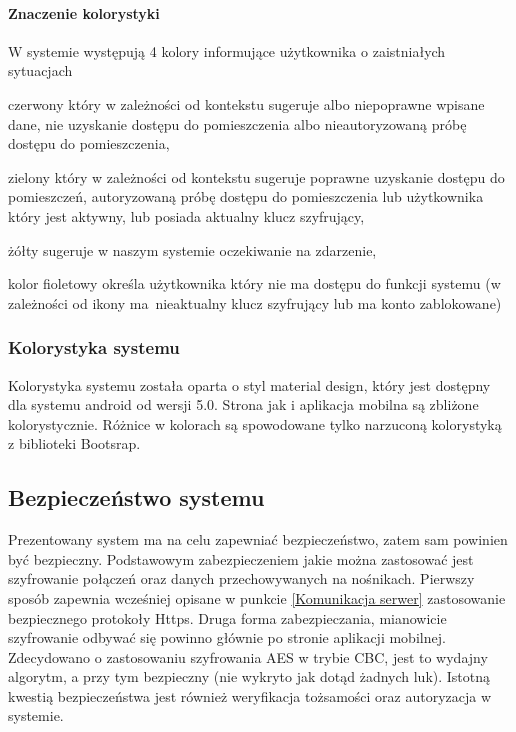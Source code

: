 \paragraph*{Znaczenie kolorystyki}
W systemie występują 4 kolory informujące użytkownika o zaistniałych sytuacjach
\begin{itemize*}
	\item czerwony który w zależności od kontekstu sugeruje albo niepoprawne wpisane dane, nie uzyskanie dostępu do pomieszczenia albo nieautoryzowaną próbę dostępu do pomieszczenia,
	\item zielony który w zależności od kontekstu sugeruje poprawne uzyskanie dostępu do pomieszczeń, autoryzowaną próbę dostępu do pomieszczenia lub użytkownika który jest aktywny, lub posiada aktualny klucz szyfrujący,
	\item żółty sugeruje w naszym systemie oczekiwanie na zdarzenie,
	\item kolor fioletowy określa użytkownika który nie ma dostępu do funkcji systemu (w zależności od ikony ma~nieaktualny klucz szyfrujący lub ma konto zablokowane)
\end{itemize*}

\subsubsection{Kolorystyka systemu}
Kolorystyka systemu została oparta o styl material design, który jest dostępny dla systemu android od wersji 5.0. Strona jak i aplikacja mobilna są zbliżone kolorystycznie. Różnice w kolorach są spowodowane tylko narzuconą kolorystyką z biblioteki Bootsrap\cite{And,desingMobile}.

\subsection{Bezpieczeństwo systemu}\label{sec:Projekt bezpieczeństwo}
Prezentowany system ma na celu zapewniać bezpieczeństwo, zatem sam powinien być bezpieczny. Podstawowym zabezpieczeniem jakie można zastosować jest szyfrowanie połączeń oraz danych przechowywanych na nośnikach. Pierwszy sposób zapewnia wcześniej opisane w punkcie \ref{Komunikacja serwer} zastosowanie bezpiecznego protokoły Https. Druga forma zabezpieczania, mianowicie szyfrowanie odbywać się powinno głównie po stronie aplikacji mobilnej. Zdecydowano o zastosowaniu szyfrowania AES w trybie CBC, jest to wydajny algorytm, a przy tym bezpieczny (nie wykryto jak dotąd żadnych luk). Istotną kwestią bezpieczeństwa jest również weryfikacja tożsamości oraz autoryzacja w systemie.
